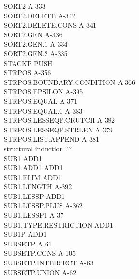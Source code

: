 \documentclass[10pt]{book}
\newenvironment{pubasis}{\begin{flushleft}}{\end{flushleft}}
\begin{document}
\begin{pubasis}
SORT2                                        A-333\\
SORT2.DELETE                                 A-342\\
SORT2.DELETE.CONS                            A-341\\
SORT2.GEN                                    A-336\\
SORT2.GEN.1                                  A-334\\
SORT2.GEN.2                                  A-335\\
STACKP                                       PUSH\\
STRPOS                                       A-356\\
STRPOS.BOUNDARY.CONDITION                    A-366\\
STRPOS.EPSILON                               A-395\\
STRPOS.EQUAL                                 A-371\\
STRPOS.EQUAL.0                               A-383\\
STRPOS.LESSEQP.CRUTCH                        A-382\\
STRPOS.LESSEQP.STRLEN                        A-379\\
STRPOS.LIST.APPEND                           A-381\\
structural induction                         ??\\
SUB1                                         ADD1\\
SUB1.ADD1                                    ADD1\\
SUB1.ELIM                                    ADD1\\
SUB1.LENGTH                                  A-392\\
SUB1.LESSP                                   ADD1\\
SUB1.LESSP.PLUS                              A-362\\
SUB1.LESSP1                                  A-37\\
SUB1.TYPE.RESTRICTION                        ADD1\\
SUB1P                                        ADD1\\
SUBSETP                                      A-61\\
SUBSETP.CONS                                 A-105\\
SUBSETP.INTERSECT                            A-63\\
SUBSETP.UNION                                A-62\\

\end{pubasis}
\end{document}
